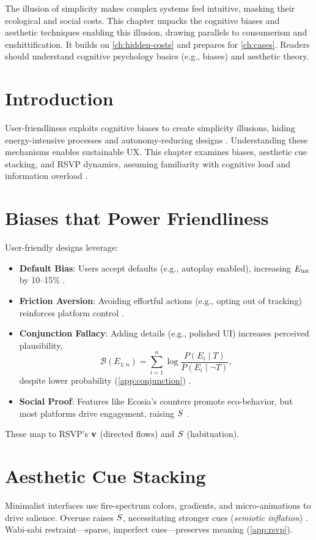 The illusion of simplicity makes complex systems feel intuitive, masking their ecological and social costs. This chapter unpacks the cognitive biases and aesthetic techniques enabling this illusion, drawing parallels to consumerism and enshittification. It builds on \cref{ch:hidden-costs} and prepares for \cref{ch:cases}. Readers should understand cognitive psychology basics (e.g., biases) and aesthetic theory.

\section{Introduction}
\label{sec:illusion-intro}
User-friendliness exploits cognitive biases to create simplicity illusions, hiding energy-intensive processes and autonomy-reducing designs \citep{colak2024,doctorow2022}. Understanding these mechanisms enables sustainable UX. This chapter examines biases, aesthetic cue stacking, and RSVP dynamics, assuming familiarity with cognitive load and information overload \citep{norman1988}.

\section{Biases that Power Friendliness}
\label{sec:biases}
User-friendly designs leverage:
\begin{itemize}
  \item \textbf{Default Bias}: Users accept defaults (e.g., autoplay enabled), increasing \(E_{\mathrm{int}}\) by 10--15\% \citep{colak2024}.
  \item \textbf{Friction Aversion}: Avoiding effortful actions (e.g., opting out of tracking) reinforces platform control \citep{doctorow2022}.
  \item \textbf{Conjunction Fallacy}: Adding details (e.g., polished UI) increases perceived plausibility,
  \begin{equation}
  \label{eq:believability}
  \mathcal{B}(E_{1:n}) = \sum_{i=1}^n \log\frac{P(E_i \mid T)}{P(E_i \mid \neg T)},
  \end{equation}
  despite lower probability (\cref{app:conjunction}) \citep{tversky1983}.
  \item \textbf{Social Proof}: Features like Ecosia’s counters promote eco-behavior, but most platforms drive engagement, raising \(S\) \citep{colak2024}.
\end{itemize}
These map to RSVP’s \(\mathbf{v}\) (directed flows) and \(S\) (habituation).

\section{Aesthetic Cue Stacking}
\label{sec:aesthetic}
Minimalist interfaces use fire-spectrum colors, gradients, and micro-animations to drive salience. Overuse raises \(S\), necessitating stronger cues (\emph{semiotic inflation}) \citep{colak2024}. Wabi-sabi restraint---sparse, imperfect cues---preserves meaning (\cref{app:rsvp}).

